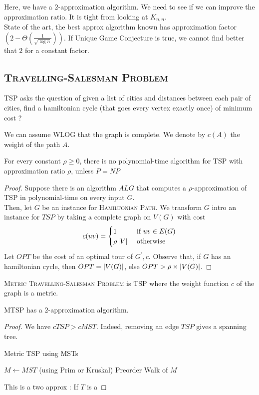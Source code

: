 \documentclass[12pt]{cours}
\begin{document}
Here, we have a $2$-approximation algorithm. We need to see if we can improve the approximation ratio. It is tight from looking at $K_{n, n}$. \\
State of the art, the best approx algorithm known has approximation factor $\left(2 - \Theta\left(\frac{1}{\sqrt{\log n}}\right)\right)$. If Unique Game Conjecture is true, we cannot find better that $2$ for a constant factor. 

\subsection{\textsc{Travelling-Salesman Problem}}
\begin{definition}
    TSP asks the question of given a list of cities and distances between each pair of cities, find a hamiltonian cycle (that goes every vertex exactly once) of minimum cost ?
\end{definition}

We can assume WLOG that the graph is complete. We denote by $c(A)$ the weight of the path $A$. \\
\begin{theorem}
    For every constant $\rho \geq 0$, there is no polynomial-time algorithm for TSP with approximation ratio $\rho$, unless $P = NP$
\end{theorem}
\begin{proof}
    Suppose there is an algorithm $ALG$ that computes a $\rho$-approximation of TSP in polynomial-time on every input $G$.\\
    Then, let $G$ be an instance for \textsc{Hamiltonian Path}. We transform $G$ intro an instance for $TSP$ by taking a complete graph on $V(G)$ with cost \[c(uv) = \begin{cases}
        1 & \text{ if } uv\in E(G)\\
        \rho\left|V\right| &\text{ otherwise}
    \end{cases}\]
    Let $OPT$ be the cost of an optimal tour of $G^{'}, c$. Observe that, if $G$ has an hamiltonian cycle, then $OPT = \left|V(G)\right|$, else $OPT > \rho \times \left|V(G)\right|$.
\end{proof}

\begin{definition}
    \textsc{Metric Travelling-Salesman Problem} is \textsc{TSP} where the weight function $c$ of the graph is a metric. 
\end{definition}

\begin{theorem}
    \textsc{MTSP} has a $2$-approximation algorithm. 
\end{theorem}
\begin{proof}
    We have $c{TSP} > c{MST}$. Indeed, removing an edge $TSP$ gives a spanning tree.
    \begin{algorithm}
        \caption{Metric TSP using MSTs}
        \begin{algorithmic}
            \State $M \gets MST$ (using Prim or Kruskal)
            \State\Return Preorder Walk of $M$
        \end{algorithmic}
    \end{algorithm}
    This is a two approx : If $T$ is a 
\end{proof}
\end{document}
